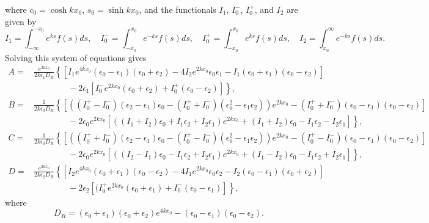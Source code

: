 \documentclass{aastex61}
\begin{document}
where $c_0 = \cosh{kx_0}$, $s_0 = \sinh{kx_0}$, and the functionals $I_1$, $I_0^-$, $I_0^+$, and $I_2$ are given by
\begin{equation}
I_1 = \int_{-\infty}^{-x_0} e^{ks}f(s) ds, \quad I_0^- = \int_{-x_0}^{x_0} e^{-ks}f(s) ds, \quad I_0^+ = \int_{-x_0}^{x_0} e^{ks}f(s) ds, \quad I_2  = \int_{x_0}^{\infty} e^{-ks}f(s) ds.
\end{equation}
Solving this system of equations gives
\newcommand{\e}{\epsilon}
\begin{align}
A = & \frac{e^{2kx_0}}{2k\e_1D_R} \left\{\left[I_1e^{4kx_0}(\e_0 - \e_1)(\e_0 + \e_2) - 4I_2e^{2kx_0}\e_0\e_1 - I_1(\e_0 + \e_1)(\e_0 - \e_2)\right]\right. \\
    & \qquad\qquad - \left. 2\e_1\left[I_0^-e^{2kx_0}(\e_0 + \e_2) + I_0^+(\e_0 - \e_2)\right]\right\}, \\
B = & \frac{1}{2k\e_0D_R} \left\{ \left[ ((I_0^+ - I_0^-)(\e_2 - \e_1)\e_0 - (I_0^+ + I_0^-)(\e_0^2 - \e_1\e_2))e^{2kx_0} - (I_0^+ + I_0^-)(\e_0 - \e_1)(\e_0 - \e_2)\right] \right. \\
    & \qquad\qquad - \left. 2\e_0e^{2kx_0}\left[((I_1 + I_2)\e_0 + I_1\e_2 + I_2\e_1)e^{2kx_0} + (I_1 + I_2)\e_0 - I_1\e_2 - I_2\e_1\right]\right\}, \\
C = & \frac{1}{2k\e_0D_R} \left\{ \left[ ((I_0^+ + I_0^-)(\e_2 - \e_1)\e_0 - (I_0^+ - I_0^-)(\e_0^2 - \e_1\e_2))e^{2kx_0} - (I_0^+ - I_0^-)(\e_0 - \e_1)(\e_0 - \e_2)\right] \right. \\
    & \qquad\qquad - \left. 2\e_0e^{2kx_0}\left[((I_2 - I_1)\e_0 - I_1\e_2 + I_2\e_1)e^{2kx_0} + (I_1 - I_2)\e_0 - I_1\e_2 + I_2\e_1\right]\right\}, \\
D = & \frac{e^{2kx_0}}{2k\e_2D_R} \left\{\left[I_2e^{4kx_0}(\e_0 + \e_1)(\e_0 - \e_2) - 4I_1e^{2kx_0}\e_0\e_2 - I_2(\e_0 - \e_1)(\e_0 + \e_2)\right] \right. \\
    & \qquad\qquad - \left. 2\e_2\left[(I_0^+e^{2kx_0}(\e_0 + \e_1) + I_0^-(\e_0 - \e_1)\right]\right\},
\end{align}
where
\begin{equation}
D_R = (\e_0 + \e_1)(\e_0 + \e_2)e^{4kx_0} - (\e_0 - \e_1)(\e_0 - \e_2).
\label{DR incomp}
\end{equation}
\end{document}
